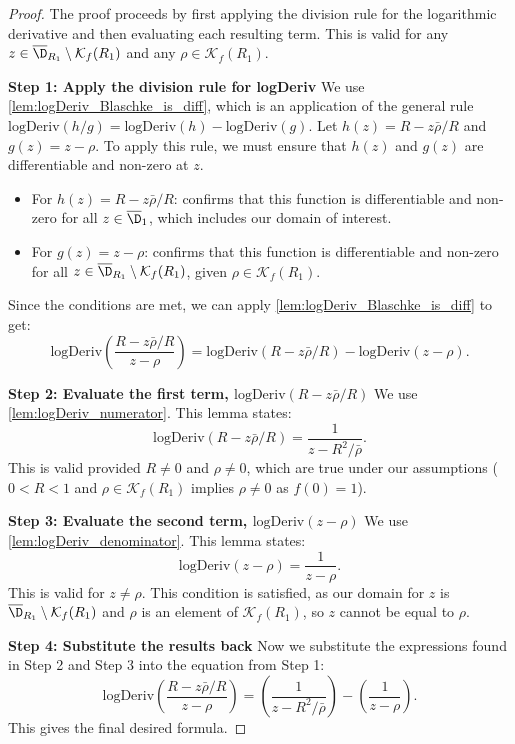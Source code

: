 \begin{proof}
\leanok
{}
The proof proceeds by first applying the division rule for the logarithmic derivative and then evaluating each resulting term. This is valid for any $z \in \overline{\D}_{R_1} \setminus \mathcal{K}_f(R_1)$ and any $\rho \in \mathcal{K}_f(R_1)$.

\textbf{Step 1: Apply the division rule for logDeriv}
We use \cref{lem:logDeriv_Blaschke_is_diff}, which is an application of the general rule $\text{logDeriv}(h/g) = \text{logDeriv}(h) - \text{logDeriv}(g)$.
Let $h(z) = R-z\bar\rho/R$ and $g(z) = z-\rho$.
To apply this rule, we must ensure that $h(z)$ and $g(z)$ are differentiable and non-zero at $z$.
\begin{itemize}
    \item For $h(z) = R-z\bar\rho/R$:  confirms that this function is differentiable and non-zero for all $z \in \overline{\D}_1$, which includes our domain of interest.
    \item For $g(z) = z-\rho$:  confirms that this function is differentiable and non-zero for all $z \in \overline{\D}_{R_1} \setminus \mathcal{K}_f(R_1)$, given $\rho \in \mathcal{K}_f(R_1)$.
\end{itemize}
Since the conditions are met, we can apply \cref{lem:logDeriv_Blaschke_is_diff} to get:
\[ \text{logDeriv}\left(\frac{R-z\bar\rho/R}{z-\rho}\right) = \text{logDeriv}(R-z\bar\rho/R) - \text{logDeriv}(z-\rho). \]

\textbf{Step 2: Evaluate the first term, $\text{logDeriv}(R-z\bar\rho/R)$}
We use \cref{lem:logDeriv_numerator}. This lemma states:
\[ \text{logDeriv}(R-z\bar\rho/R) = \frac{1}{z-R^2/\bar\rho}. \]
This is valid provided $R \neq 0$ and $\rho \neq 0$, which are true under our assumptions ($0<R<1$ and $\rho \in \mathcal{K}_f(R_1)$ implies $\rho \neq 0$ as $f(0)=1$).

\textbf{Step 3: Evaluate the second term, $\text{logDeriv}(z-\rho)$}
We use \cref{lem:logDeriv_denominator}. This lemma states:
\[ \text{logDeriv}(z-\rho) = \frac{1}{z-\rho}. \]
This is valid for $z \neq \rho$. This condition is satisfied, as our domain for $z$ is $\overline{\D}_{R_1} \setminus \mathcal{K}_f(R_1)$ and $\rho$ is an element of $\mathcal{K}_f(R_1)$, so $z$ cannot be equal to $\rho$.

\textbf{Step 4: Substitute the results back}
Now we substitute the expressions found in Step 2 and Step 3 into the equation from Step 1:
\[ \text{logDeriv}\left(\frac{R-z\bar\rho/R}{z-\rho}\right) = \left(\frac{1}{z-R^2/\bar\rho}\right) - \left(\frac{1}{z-\rho}\right). \]
This gives the final desired formula.
\end{proof}

